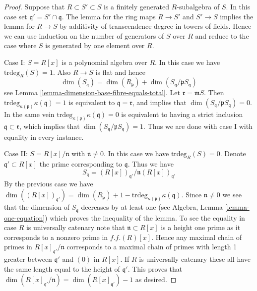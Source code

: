 \begin{proof}
Suppose that $R \subset S' \subset S$ is a finitely generated $R$-subalgebra
of $S$. In this case set $\mathfrak q' = S' \cap \mathfrak q$.
The lemma for the ring maps $R \to S'$ and $S' \to S$ implies the
lemma for $R \to S$ by additivity of transcendence degree in towers
of fields. Hence we can use induction on the number of generators
of $S$ over $R$ and reduce to the case where $S$ is generated by
one element over $R$.

\medskip\noindent
Case I: $S = R[x]$ is a polynomial algebra over $R$.
In this case we have $\text{trdeg}_{R}(S) = 1$.
Also $R \to S$ is flat and hence
$$
\dim(S_{\mathfrak q}) =
\dim(R_{\mathfrak p}) + \dim(S_{\mathfrak q}/\mathfrak pS_{\mathfrak q})
$$
see Lemma \ref{lemma-dimension-base-fibre-equals-total}.
Let $\mathfrak r = \mathfrak mS$. Then
$\text{trdeg}_{\kappa(\mathfrak p)} \kappa(\mathfrak q) = 1$
is equivalent to $\mathfrak q = \mathfrak r$, and implies that
$\dim(S_{\mathfrak q}/\mathfrak pS_{\mathfrak q}) = 0$.
In the same vein $\text{trdeg}_{\kappa(\mathfrak p)} \kappa(\mathfrak q) = 0$
is equivalent to having a strict inclusion
$\mathfrak q \subset \mathfrak r$, which implies that
$\dim(S_{\mathfrak q}/\mathfrak pS_{\mathfrak q}) = 1$.
Thus we are done with case I with equality in every instance.

\medskip\noindent
Case II: $S = R[x]/\mathfrak n$ with $\mathfrak n \not = 0$.
In this case we have $\text{trdeg}_{R}(S) = 0$.
Denote $\mathfrak q' \subset R[x]$ the prime corresponding to $\mathfrak q$.
Thus we have
$$
S_{\mathfrak q} = (R[x])_{\mathfrak q'}/\mathfrak n(R[x])_{\mathfrak q'}
$$
By the previous case we have
$\dim((R[x])_{\mathfrak q'}) =
\dim(R_{\mathfrak p}) + 1
- \text{trdeg}_{\kappa(\mathfrak p)} \kappa(\mathfrak q)$.
Since $\mathfrak n \not = 0$ we see that the dimension of
$S_{\mathfrak q}$ decreases by at least one (see
Algebra, Lemma \ref{lemma-one-equation})
which proves the
inequality of the lemma.
To see the equality in case $R$ is universally catenary note that
$\mathfrak n \subset R[x]$ is a height one prime as it corresponds
to a nonzero prime in $f.f.(R)[x]$. Hence any maximal chain of primes
in $R[x]_{\mathfrak q'}/\mathfrak n$ corresponds to a maximal chain of primes
with length 1 greater between $\mathfrak q'$ and $(0)$ in $R[x]$.
If $R$ is universally catenary these all have the same length equal to
the height of $\mathfrak q'$. This proves that
$\dim(R[x]_{\mathfrak q'}/\mathfrak n) = \dim(R[x]_{\mathfrak q'}) - 1$
as desired.
\end{proof}

